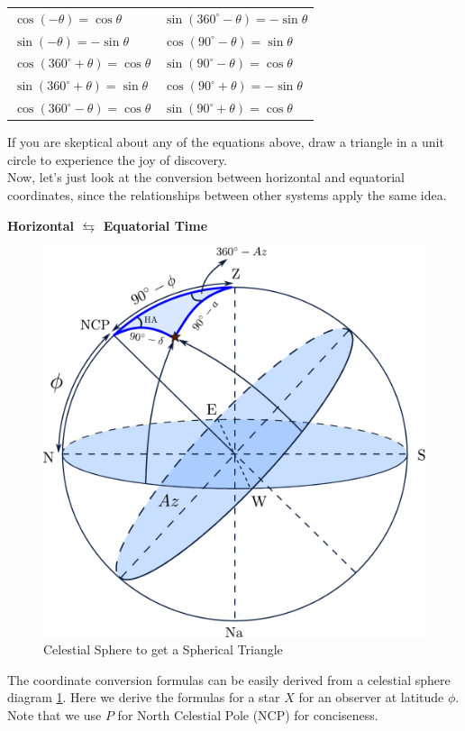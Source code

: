 \documentclass[a4paper,12pt]{extarticle}
\begin{document}
\begin{table}[H]
	\centering
	\begin{tabular}{ll}
		$\cos (-\theta) = \cos \theta$ &\quad $\sin (360^\circ - \theta) = -\sin \theta$ \\
		$\sin (-\theta) = -\sin \theta$ &\quad $\cos (90^\circ - \theta) = \sin \theta$ \\
		$\cos (360^\circ + \theta) = \cos \theta$ &\quad $\sin (90^\circ - \theta) = \cos \theta$ \\
		$\sin (360^\circ + \theta) = \sin \theta$ &\quad $\cos (90^\circ + \theta) = -\sin \theta$ \\
		$\cos (360^\circ - \theta) = \cos \theta$ &\quad $\sin (90^\circ + \theta) = \cos \theta$ \\
	\end{tabular}
\end{table}


If you are skeptical about any of the equations above, draw a triangle in a unit circle to experience the joy of discovery. \\

Now, let's just look at the conversion between horizontal and equatorial coordinates, since the relationships between other systems apply the same idea.

\begin{center}
	\textbf{Horizontal $\leftrightarrows$ Equatorial Time}
\end{center}

\begin{figure}[H]
	\centering
	\includegraphics[width=0.6\linewidth]{potd6a}
	\caption{Celestial Sphere to get a Spherical Triangle}
	\label{transformation1}
\end{figure}
The coordinate conversion formulas can be easily derived from a celestial sphere diagram \ref{transformation1}. Here we derive the formulas for a star $X$ for an observer at latitude $\phi$. Note that we use $P$ for North Celestial Pole (NCP) for conciseness.\\
\end{document}
